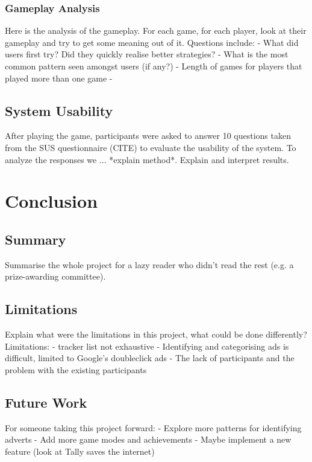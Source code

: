 \documentclass{l4proj}
\begin{document}
\subsection{Gameplay Analysis}
Here is the analysis of the gameplay. For each game, for each player, look at their gameplay and try to get some meaning out of it.
Questions include:
 - What did users first try? Did they quickly realise better strategies?
 - What is the most common pattern seen amongst users (if any?)
 - Length of games for players that played more than one game
 - 

\section{System Usability}
After playing the game, participants were asked to answer 10 questions taken from the SUS questionnaire (CITE) to evaluate the usability of the system. To analyze the responses we ... *explain method*. Explain and 
interpret results. 

\chapter{Conclusion}    

\section{Summary}
Summarise the whole project for a lazy reader who didn't read the rest (e.g. a prize-awarding committee).

\section{Limitations}
Explain what were the limitations in this project, what could be done differently? 
Limitations:
 - tracker list not exhaustive
 - Identifying and categorising ads is difficult, limited to Google's doubleclick ads
 - The lack of participants and the problem with the existing participants

\section{Future Work}
For someone taking this project forward:
 - Explore more patterns for identifying adverts
 - Add more game modes and achievements
 - Maybe implement a new feature (look at Tally saves the internet)
\end{document}
